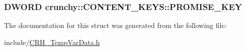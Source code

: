 \subsubsection[{P\+R\+O\+M\+I\+S\+E\+\_\+\+K\+E\+Y}]{\setlength{\rightskip}{0pt plus 5cm}D\+W\+O\+R\+D crunchy\+::\+C\+O\+N\+T\+E\+N\+T\+\_\+\+K\+E\+Y\+S\+::\+P\+R\+O\+M\+I\+S\+E\+\_\+\+K\+E\+Y}\label{structcrunchy_1_1_c_o_n_t_e_n_t___k_e_y_s_a37a28b896918cb39a79d25d469506c7a}


The documentation for this struct was generated from the following file\+:\begin{DoxyCompactItemize}
\item 
include/\hyperlink{_c_r_h___temp_var_data_8h}{C\+R\+H\+\_\+\+Temp\+Var\+Data.\+h}\end{DoxyCompactItemize}
